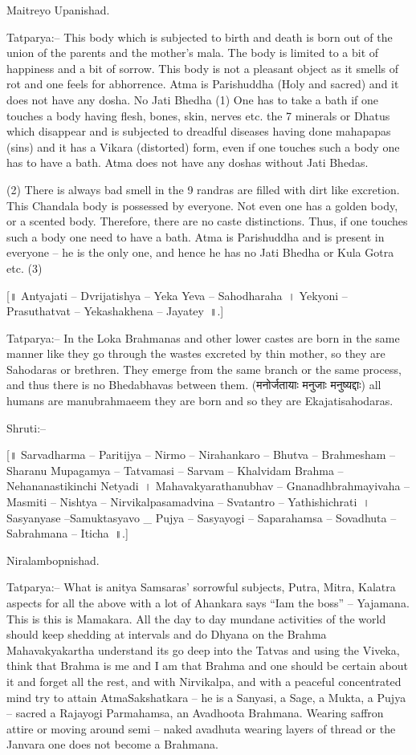 Maitreyo Upanishad.

Tatparya:– This body which is subjected to birth and death is born out of the union of the parents and the mother's mala. The body is limited to a bit of happiness and a bit of sorrow. This body is not a pleasant object as it smells of rot and one feels for abhorrence. Atma is Parishuddha (Holy and sacred) and it does not have any dosha. No Jati Bhedha (1) One has to take a bath if one touches a body having flesh, bones, skin, nerves etc. the 7 minerals or Dhatus which disappear and is subjected to dreadful diseases having done mahapapas (sins) and it has a Vikara (distorted) form, even if one touches such a body one has to have a bath. Atma does not have any doshas without Jati Bhedas.

(2) There is always bad smell in the 9 randras are filled with dirt like excretion. This Chandala body is possessed by everyone. Not even one has a golden body, or a scented body. Therefore, there are no caste distinctions. Thus, if one touches such a body one need to have a bath. Atma is Parishuddha and is present in everyone – he is the only one, and hence he has no Jati Bhedha or Kula Gotra etc. (3)

[॥ Antyajati – Dvrijatishya – Yeka Yeva – Sahodharaha~। Yekyoni – Prasuthatvat – Yekashakhena – Jayatey~॥.]

Tatparya:– In the Loka Brahmanas and other lower castes are born in the same manner like they go through the wastes excreted by thin mother, so they are Sahodaras or brethren. They emerge from the same branch or the same process, and thus there is no Bhedabhavas between them. (मनोर्जतायाः मनुजाः मनुष्यद्दाः) all humans are manubrahmaeem they are born and so they are Ekajatisahodaras.

Shruti:–

[॥ Sarvadharma – Paritijya – Nirmo – Nirahankaro – Bhutva – Brahmesham – Sharanu Mupagamya – Tatvamasi – Sarvam – Khalvidam Brahma – Nehananastikinchi Netyadi~। Mahavakyarathanubhav – Gnanadhbrahmayivaha – Masmiti – Nishtya – Nirvikalpasamadvina – Svatantro – Yathishichrati~। Sasyanyase –Samuktasyavo \_ Pujya – Sasyayogi – Saparahamsa – Sovadhuta – Sabrahmana – Iticha~॥.]

Niralambopnishad.

Tatparya:– What is anitya Samsaras' sorrowful subjects, Putra, Mitra, Kalatra aspects for all the above with a lot of Ahankara says “Iam the boss” – Yajamana. This is this is Mamakara. All the day to day mundane activities of the world should keep shedding at intervals and do Dhyana on the Brahma Mahavakyakartha understand its go deep into the Tatvas and using the Viveka, think that Brahma is me and I am that Brahma and one should be certain about it and forget all the rest, and with Nirvikalpa, and with a peaceful concentrated mind try to attain AtmaSakshatkara – he is a Sanyasi, a Sage, a Mukta, a Pujya – sacred a Rajayogi Parmahamsa, an Avadhoota Brahmana. Wearing saffron attire or moving around semi – naked avadhuta wearing layers of thread or the Janvara one does not become a Brahmana.

